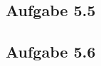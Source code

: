 \documentclass{standalone}
\begin{document}
    
\subsection{Aufgabe 5.5}


\subsection{Aufgabe 5.6}
\end{document}
